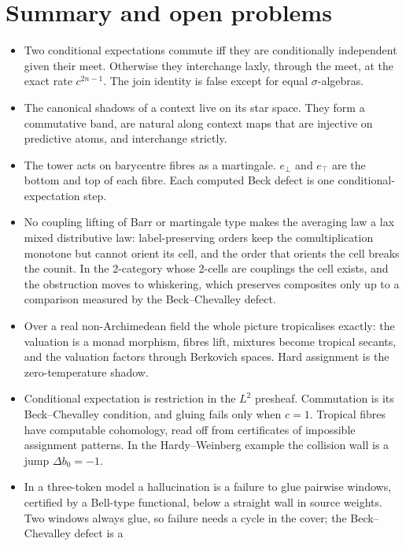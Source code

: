 \documentclass[11pt]{article}
\theoremstyle{definition}
\newcommand{\ebot}{e_{\perp}}
\newcommand{\etop}{e_{\top}}
\begin{document}
\section{Summary and open problems}
\begin{itemize}
\item Two conditional expectations commute iff they are conditionally independent given their meet. Otherwise they interchange laxly,
  through the meet, at the exact rate $c^{2n-1}$. The join identity is false except for equal $\sigma$-algebras.
\item The canonical shadows of a context live on its star space. They form a commutative band, are natural along context maps that are
  injective on predictive atoms, and interchange strictly.
\item The tower acts on barycentre fibres as a martingale. $\ebot$ and $\etop$ are the bottom and top of each fibre. Each computed Beck
  defect is one conditional-expectation step.
\item No coupling lifting of Barr or martingale type makes the averaging law a lax mixed distributive law: label-preserving orders keep
  the comultiplication monotone but cannot orient its cell, and the order that orients the cell breaks the counit. In the 2-category whose 2-cells are couplings the cell exists, and the obstruction moves to whiskering,
  which preserves composites only up to a comparison measured by the Beck--Chevalley defect.
\item Over a real non-Archimedean field the whole picture tropicalises exactly: the valuation is a monad morphism, fibres lift,
  mixtures become tropical secants, and the valuation factors through Berkovich spaces. Hard assignment is the zero-temperature
  shadow.
\item Conditional expectation is restriction in the $L^2$ presheaf. Commutation is its Beck--Chevalley condition, and gluing fails only
  when $c=1$. Tropical fibres have computable cohomology, read off from certificates of impossible assignment patterns. In the
  Hardy--Weinberg example the collision wall is a jump $\Delta b_0=-1$.
\item In a three-token model a hallucination is a failure to glue pairwise windows, certified by a Bell-type functional, below a
  straight wall in source weights. Two windows always glue, so failure needs a cycle in the cover; the Beck--Chevalley defect is a

\end{itemize}
\end{document}
